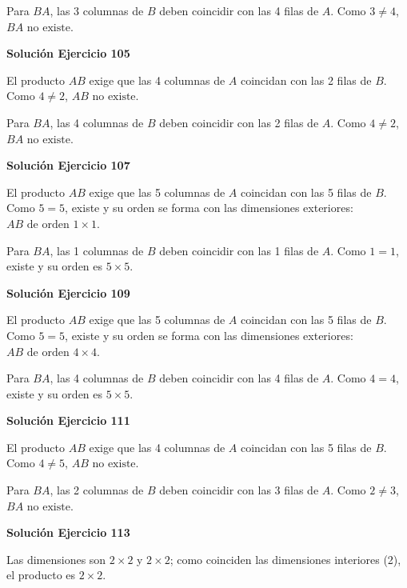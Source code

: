 Para $BA$, las 3 columnas de $B$ deben coincidir con las 4 filas de $A$. Como $3\neq4$, $\boxed{BA\text{ no existe}}$.


\par\bigskip\noindent\textbf{Solución Ejercicio 105}\par\nobreak
El producto $AB$ exige que las 4 columnas de $A$ coincidan con las 2 filas de $B$. Como $4\neq2$, $\boxed{AB\text{ no existe}}$.

Para $BA$, las 4 columnas de $B$ deben coincidir con las 2 filas de $A$. Como $4\neq2$, $\boxed{BA\text{ no existe}}$.


\par\bigskip\noindent\textbf{Solución Ejercicio 107}\par\nobreak
El producto $AB$ exige que las 5 columnas de $A$ coincidan con las 5 filas de $B$. Como $5=5$, existe y su orden se forma con las dimensiones exteriores: $\boxed{AB\text{ de orden } 1\times 1}$.

Para $BA$, las 1 columnas de $B$ deben coincidir con las 1 filas de $A$. Como $1=1$, existe y su orden es $\boxed{5\times 5}$.


\par\bigskip\noindent\textbf{Solución Ejercicio 109}\par\nobreak
El producto $AB$ exige que las 5 columnas de $A$ coincidan con las 5 filas de $B$. Como $5=5$, existe y su orden se forma con las dimensiones exteriores: $\boxed{AB\text{ de orden } 4\times 4}$.

Para $BA$, las 4 columnas de $B$ deben coincidir con las 4 filas de $A$. Como $4=4$, existe y su orden es $\boxed{5\times 5}$.


\par\bigskip\noindent\textbf{Solución Ejercicio 111}\par\nobreak
El producto $AB$ exige que las 4 columnas de $A$ coincidan con las 5 filas de $B$. Como $4\neq5$, $\boxed{AB\text{ no existe}}$.

Para $BA$, las 2 columnas de $B$ deben coincidir con las 3 filas de $A$. Como $2\neq3$, $\boxed{BA\text{ no existe}}$.


\par\bigskip\noindent\textbf{Solución Ejercicio 113}\par\nobreak
Las dimensiones son $2\times2$ y $2\times2$; como coinciden las dimensiones interiores (2), el producto es $2\times2$.

